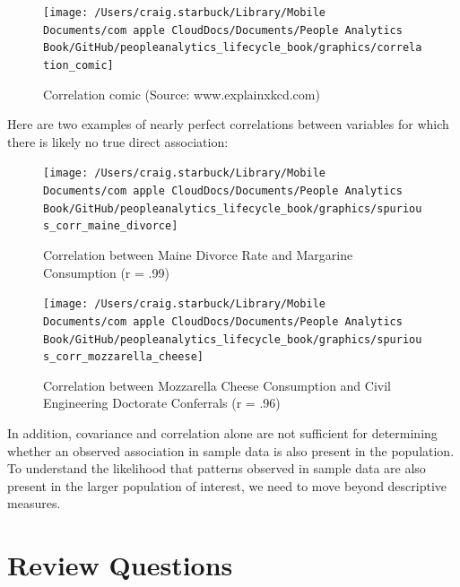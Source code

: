 \documentclass[]{book}
\begin{document}
\begin{figure}

{\centering \texttt{[image: /Users/craig.starbuck/Library/Mobile Documents/com~apple~CloudDocs/Documents/People Analytics Book/GitHub/peopleanalytics\_lifecycle\_book/graphics/correlation\_comic]} 

}

\caption{Correlation comic (Source: www.explainxkcd.com)}\label{fig:corr-comic}
\end{figure}

Here are two examples of nearly perfect correlations between variables for which there is likely no true direct association:

\begin{figure}

{\centering \texttt{[image: /Users/craig.starbuck/Library/Mobile Documents/com~apple~CloudDocs/Documents/People Analytics Book/GitHub/peopleanalytics\_lifecycle\_book/graphics/spurious\_corr\_maine\_divorce]} 

}

\caption{Correlation between Maine Divorce Rate and Margarine Consumption (r = .99)}\label{fig:spur-corr-1}
\end{figure}

\begin{figure}

{\centering \texttt{[image: /Users/craig.starbuck/Library/Mobile Documents/com~apple~CloudDocs/Documents/People Analytics Book/GitHub/peopleanalytics\_lifecycle\_book/graphics/spurious\_corr\_mozzarella\_cheese]} 

}

\caption{Correlation between Mozzarella Cheese Consumption and Civil Engineering Doctorate Conferrals (r = .96)}\label{fig:spur-corr-2}
\end{figure}

In addition, covariance and correlation alone are not sufficient for determining whether an observed association in sample data is also present in the population. To understand the likelihood that patterns observed in sample data are also present in the larger population of interest, we need to move beyond descriptive measures.

\hypertarget{review-questions-3}{%
\section{Review Questions}\label{review-questions-3}}
\end{document}
